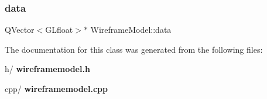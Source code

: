 \subsubsection{data}
{\footnotesize\ttfamily Q\+Vector$<$G\+Lfloat$>$$\ast$ Wireframe\+Model\+::data\hspace{0.3cm}{\ttfamily [private]}}



The documentation for this class was generated from the following files\+:\begin{DoxyCompactItemize}
\item 
h/\textbf{ wireframemodel.\+h}\item 
cpp/\textbf{ wireframemodel.\+cpp}\end{DoxyCompactItemize}
